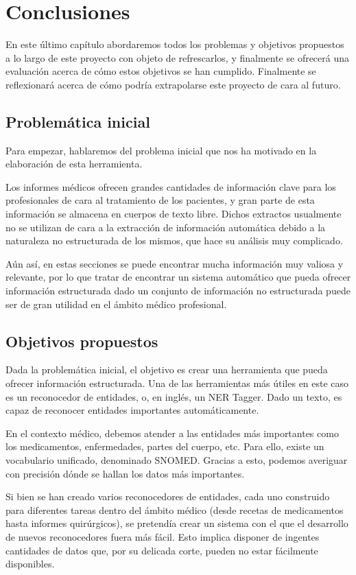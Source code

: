 \chapter{Conclusiones}
En este último capítulo abordaremos todos los problemas y objetivos propuestos a lo largo de este proyecto con objeto de refrescarlos, y finalmente se ofrecerá una evaluación acerca de cómo estos objetivos se han cumplido. Finalmente se reflexionará acerca de cómo podría extrapolarse este proyecto de cara al futuro.

\section{Problemática inicial}
Para empezar, hablaremos del problema inicial que nos ha motivado en la elaboración de esta herramienta.

Los informes médicos ofrecen grandes cantidades de información clave para los profesionales de cara al tratamiento de los pacientes, y gran parte de esta información se almacena en cuerpos de texto libre. Dichos extractos usualmente no se utilizan de cara a la extracción de información automática debido a la naturaleza no estructurada de los mismos, que hace su análisis muy complicado.

Aún así, en estas secciones se puede encontrar mucha información muy valiosa y relevante, por lo que tratar de encontrar un sistema automático que pueda ofrecer información estructurada dado un conjunto de información no estructurada puede ser de gran utilidad en el ámbito médico profesional.

\section{Objetivos propuestos}
Dada la problemática inicial, el objetivo es crear una herramienta que pueda ofrecer información estructurada. Una de las herramientas más útiles en este caso es un reconocedor de entidades, o, en inglés, un NER Tagger. Dado un texto, es capaz de reconocer entidades importantes automáticamente.

En el contexto médico, debemos atender a las entidades más importantes como los medicamentos, enfermedades, partes del cuerpo, etc. Para ello, existe un vocabulario unificado, denominado SNOMED. Gracias a esto, podemos averiguar con precisión dónde se hallan los datos más importantes.

Si bien se han creado varios reconocedores de entidades, cada uno construido para diferentes tareas dentro del ámbito médico (desde recetas de medicamentos hasta informes quirúrgicos), se pretendía crear un sistema con el que el desarrollo de nuevos reconocedores fuera más fácil. Esto implica disponer de ingentes cantidades de datos que, por su delicada corte, pueden no estar fácilmente disponibles.

